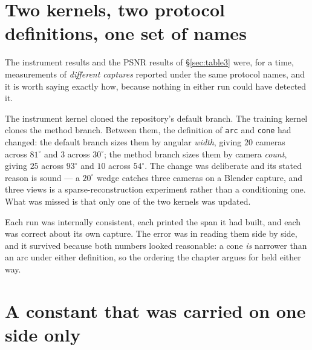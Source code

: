 \section{Two kernels, two protocol definitions, one set of names}
\label{sec:branchdefect}

The instrument results and the PSNR results of \S\ref{sec:table3} were, for a
time, measurements of \emph{different captures} reported under the same protocol
names, and it is worth saying exactly how, because nothing in either run could
have detected it.

The instrument kernel cloned the repository's default branch. The training kernel
clones the method branch. Between them, the definition of \texttt{arc} and
\texttt{cone} had changed: the default branch sizes them by angular \emph{width},
giving $20$ cameras across $81^\circ$ and $3$ across $30^\circ$; the method
branch sizes them by camera \emph{count}, giving $25$ across $93^\circ$ and $10$
across $54^\circ$. The change was deliberate and its stated reason is sound --- a
$20^\circ$ wedge catches three cameras on a Blender capture, and three views is a
sparse-reconstruction experiment rather than a conditioning one. What was missed
is that only one of the two kernels was updated.

Each run was internally consistent, each printed the span it had built, and each
was correct about its own capture. The error was in reading them side by side,
and it survived because both numbers looked reasonable: a cone \emph{is} narrower
than an arc under either definition, so the ordering the chapter argues for held
either way.


\section{A constant that was carried on one side only}
\label{sec:m2defect}

